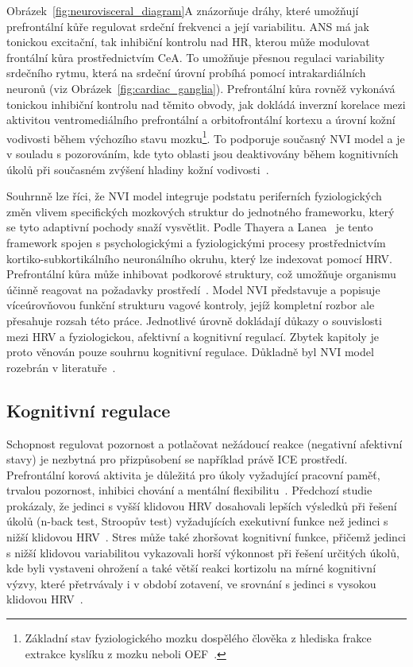 Obrázek~\ref{fig:neurovisceral_diagram}A znázorňuje dráhy, které umožňují
prefrontální kůře regulovat srdeční frekvenci a její variabilitu. \gls{ANS} má
jak tonickou excitační, tak inhibiční kontrolu nad \gls{HR}, kterou může
modulovat frontální kůra prostřednictvím \gls{CeA}. To umožňuje přesnou regulaci
variability srdečního rytmu, která na srdeční úrovní probíhá pomocí
intrakardiálních neuronů (viz Obrázek~\ref{fig:cardiac_ganglia}). Prefrontální
kůra rovněž vykonává tonickou inhibiční kontrolu nad těmito obvody, jak dokládá
inverzní korelace mezi aktivitou ventromediálního prefrontální a orbitofrontální
kortexu a úrovní kožní vodivosti během výchozího stavu mozku\footnote{Základní
stav fyziologického mozku dospělého člověka z hlediska frakce extrakce kyslíku z
mozku neboli OEF~\cite{Raichle2001}.}. To podporuje současný \gls{NVI} model a je
v souladu s pozorováním, kde tyto oblasti jsou deaktivovány během kognitivních
úkolů při současném zvýšení hladiny kožní
vodivosti~\cite{Nagai2004,Raichle2001,Thayer_Lane_2009}.

Souhrnně lze říci, že \gls{NVI} model integruje podstatu periferních
fyziologických změn vlivem specifických mozkových struktur do jednotného
frameworku, který se tyto adaptivní pochody snaží vysvětlit. Podle Thayera a
Lanea~\cite{Thayer_Lane_2000} je tento framework spojen s psychologickými a
fyziologickými procesy prostřednictvím kortiko-subkortikálního neuronálního
okruhu, který lze indexovat pomocí \gls{HRV}. Prefrontální kůra může inhibovat
podkorové struktury, což umožňuje organismu účinně reagovat na požadavky
prostředí~\cite{Thayer_Lane_2009}. Model \gls{NVI} představuje a popisuje
víceúrovňovou funkční strukturu vagové kontroly, jejíž kompletní rozbor ale
přesahuje rozsah této práce. Jednotlivé úrovně dokládají důkazy o souvislosti
mezi \gls{HRV} a fyziologickou, afektivní a kognitivní regulací. Zbytek kapitoly
je proto věnován pouze souhrnu kognitivní regulace. Důkladně byl \gls{NVI} model
rozebrán v literatuře~\cite{Smith_Thayer_Khalsa_Lane_2017,Thayer2009,Thayer_Lane_2009}.

\subsection{Kognitivní regulace}
Schopnost regulovat pozornost a potlačovat nežádoucí reakce (negativní afektivní
stavy) je nezbytná pro přizpůsobení se například právě \gls{ICE} prostředí.
Prefrontální korová aktivita je důležitá pro úkoly vyžadující pracovní paměť,
trvalou pozornost, inhibici chování a mentální
flexibilitu~\cite{Thayer_Lane_2009}. Předchozí studie prokázaly, že jedinci s
vyšší klidovou \gls{HRV} dosahovali lepších výsledků při řešení úkolů (n-back
test, Stroopův test) vyžadujících exekutivní funkce než jedinci s nižší klidovou
\gls{HRV}~\cite{Hansen_Johnsen_Thayer_2003,
Johnsen_Thayer_Laberg_Wormnes_Raadal_Skaret_Kvale_Berg_2003}. Stres může také
zhoršovat kognitivní funkce, přičemž jedinci s nižší klidovou variabilitou
vykazovali horší výkonnost při řešení určitých úkolů, kde byli vystaveni
ohrožení a také větší reakci kortizolu na mírné kognitivní výzvy, které
přetrvávaly i v období zotavení, ve srovnání s jedinci s vysokou klidovou
\gls{HRV}~\cite{Thayer_Lane_2009}.

